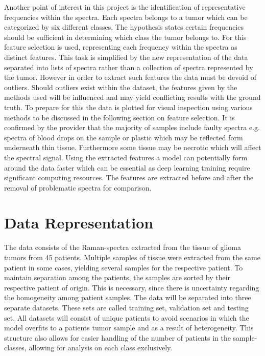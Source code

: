Another point of interest in this project is the identification of representative frequencies within the spectra. Each spectra belongs to a tumor which can be categorized by six different classes. The hypothesis states certain frequencies should be sufficient in determining which class the tumor belongs to. For this feature selection is used, representing each frequency within the spectra as distinct features. This task is simplified by the new representation of the data separated into lists of spectra rather than a collection of spectra represented by the tumor. However in order to extract such features the data must be devoid of outliers. Should outliers exist within the dataset, the features given by the methods used will be influenced and may yield conflicting results with the ground truth. To prepare for this the data is plotted for visual inspection using various methods to be discussed in the following section on feature selection. It is confirmed by the provider that the majority of samples include faulty spectra e.g. spectra of blood drops on the sample or plastic which may be reflected form underneath thin tissue. Furthermore some tissue may be necrotic which will affect the spectral signal. Using the extracted features a model can potentially form around the data faster which can be essential as deep learning training require significant computing resources. The features are extracted before and after the removal of problematic spectra for comparison.


\section{Data Representation}
The data consists of the Raman-spectra extracted from the tissue of glioma tumors from 45 patients. Multiple samples of tissue were extracted from the same patient in some cases, yielding several samples for the respective patient. To maintain separation among the patients, the samples are sorted by their respective patient of origin. This is necessary, since there is uncertainty regarding the homogeneity among patient samples. The data will be separated into three separate datasets. These sets are called training set, validation set and testing set. All datasets will consist of unique patients to avoid scenarios in which the model overfits to a patients tumor sample and as a result of heterogeneity. This structure also allows for easier handling of the number of patients in the sample-classes, allowing for analysis on each class exclusively. 

